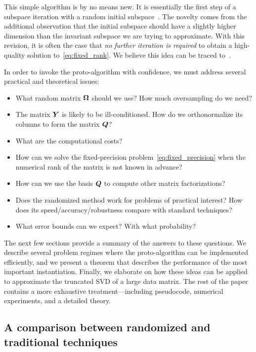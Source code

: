 \documentclass[final]{siamltex}
\newcounter{algorithm}[section]
\begin{document}
This simple algorithm is by no means new. It is essentially the
first step of a subspace iteration with a random initial
subspace~\cite[\S7.3.2]{golub}. The novelty comes from the
additional observation that the initial subspace should have a
slightly higher dimension than the invariant subspace we are trying
to approximate.  With this revision, it is often the case that
\emph{no further iteration is required} to obtain a high-quality
solution to~\eqref{eq:fixed_rank}.  We believe this idea can be
traced to~\cite{Sar06:Improved-Approximation,random1,papadimitriou}.

In order to invoke the proto-algorithm with confidence, we must
address several practical and theoretical issues:

\lsp

\begin{itemize}
\item   What random matrix $\bm{\Omega}$ should we use?  How much oversampling do we need?
\item   The matrix $\bm{Y}$ is likely to be ill-conditioned. How do we orthonormalize its
        columns to form the matrix $\bm{Q}$?
\item   What are the computational costs?
\item   How can we solve the fixed-precision problem~\eqref{eq:fixed_precision}
        when the numerical rank of the matrix is not known in advance?
\item   How can we use the basis $\bm{Q}$ to compute other matrix factorizations?
\item   Does the randomized method work for problems of practical interest?
        How does its speed/accuracy/robustness compare with standard techniques?
\item   What error bounds can we expect?  With what probability?
\end{itemize}

\lsp

\noindent The next few sections provide a summary of the answers to
these questions. We describe several problem regimes where the
proto-algorithm can be implemented efficiently, and we present a
theorem that describes the performance of the most important
instantiation.  Finally, we elaborate on how these ideas can
be applied to approximate the truncated SVD of a large data matrix.
The rest of the paper contains a more exhaustive
treatment---including pseudocode, numerical experiments, and a
detailed theory.

\subsection{A comparison between randomized and traditional techniques}
\end{document}
